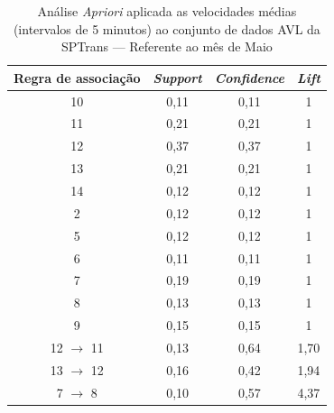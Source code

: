 \documentclass[
	12pt,				%
	oneside,			%
	a4paper,			%
	english,			%
	brazil				%
	]{abntex2ppgsi}
\begin{document}
{{{\begin{apendicesenv}
\begin{table}[!htb]
\centering
\caption {Análise \textit{Apriori} aplicada as velocidades médias (intervalos de 5 minutos) ao conjunto de dados AVL da SPTrans --- Referente ao mês de Maio}
\label {tab:aprioriMay}
\begin{tabular}{c|c|c|c}
\toprule
\textbf{Regra de associação} & \textit{\textbf{Support}} & \textit{\textbf{Confidence}} & \textit{\textbf{Lift}} \\
\midrule
10 &  0,11 &  0,11 &  1\\
\hline
11 &  0,21 &  0,21 &  1\\
\hline
12 &  0,37 &  0,37 &  1\\
\hline
13 &  0,21 &  0,21 &  1\\
\hline
14 &  0,12 &  0,12 &  1\\
\hline
2 &  0,12 &  0,12 &  1\\
\hline
5 &  0,12 &  0,12 &  1\\
\hline
6 &  0,11 &  0,11 &  1\\
\hline
7 &  0,19 &  0,19 &  1\\
\hline
8 &  0,13 &  0,13 &  1\\
\hline
9 &  0,15 &  0,15 &  1\\
\hline
12 $\rightarrow$ 11 &  0,13 &  0,64 &  1,70\\
\hline
13 $\rightarrow$ 12 &  0,16 &  0,42 &  1,94\\
\hline
7 $\rightarrow$ 8 &  0,10 &  0,57 &  4,37\\
\bottomrule
\end{tabular}
\end{table}


\end{apendicesenv}}}}
\end{document}
